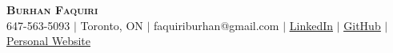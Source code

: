\begin{center}
    \textbf{\Huge \scshape Burhan Faquiri} \\ \vspace{1pt}
    \small 647-563-5093 $|$ Toronto, ON $|$ {faquiriburhan@gmail.com} $|$ 
    \href{https://www.linkedin.com/in/burhanfaquiri}{\underline{LinkedIn}} $|$ 
    \href{https://github.com/burhanf}{\underline{GitHub}} $|$
    \href{https://www.burhanfaquiri.com}{\underline{Personal Website}}
\end{center}
